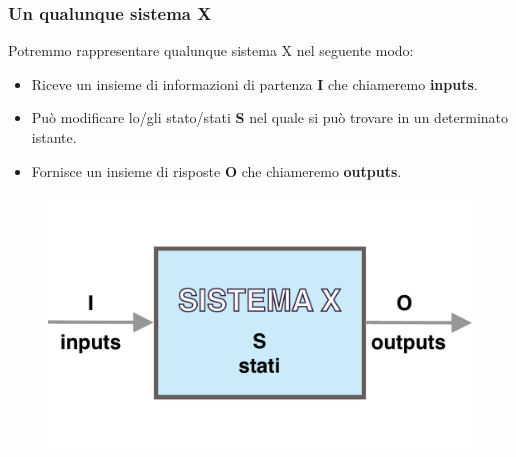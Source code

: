 \begin{frame}
	\frametitle{Un qualunque sistema X}
	
	\begin{block}{Potremmo rappresentare qualunque sistema X nel seguente modo:}
		\begin{itemize}
			\item Riceve un insieme di informazioni di partenza \textbf{I} che chiameremo \textbf{inputs}.
			\item Può modificare lo/gli stato/stati \textbf{S} nel quale si può trovare in un determinato istante.
			\item Fornisce un insieme di risposte \textbf{O} che chiameremo \textbf{outputs}.
		\end{itemize}
		
		\begin{figure}[!htbp]
			\centering
			\includegraphics[width=0.45\linewidth]{images/1_i_sistemi/sistemaX.pdf}
		\end{figure}
	\end{block}
\end{frame}
